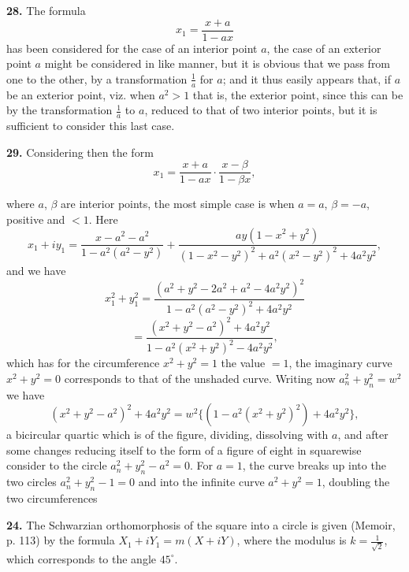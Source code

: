\documentclass[11pt,a4paper]{book}
\begin{document}
\textbf{28.} The formula
\[
x_1 = \frac{x + a}{1 - ax}
\]
has been considered for the case of an interior point $a$, the case of an exterior point $a$ might be considered in like manner, but it is obvious that we pass from one to the other, by a transformation $\frac{1}{a}$ for $a$; and it thus easily appears that, if $a$ be an exterior point, viz. when $a^2 > 1$ that is, the exterior point, since this can be by the transformation $\frac{1}{a}$ to $a$, reduced to that of two interior points, but it is sufficient to consider this last case.

\textbf{29.} Considering then the form
\[
x_1 = \frac{x + a}{1 - ax} \cdot \frac{x - \beta}{1 - \beta x},
\]

where $a$, $\beta$ are interior points, the most simple case is when $a = a$, $\beta = -a$, positive and $< 1$. Here
\[
x_1 + iy_1 = \frac{x - a^2 - a^2}{1 - a^2(a^2 - y^2)} + \frac{ay(1 - x^2 + y^2)}{(1 - x^2 - y^2)^2 + a^2(x^2 - y^2)^2 + 4a^2 y^2},
\]
and we have
\[
x_1^2 + y_1^2 = \frac{(a^2 + y^2 - 2a^2 + a^2 - 4a^2 y^2)^2}{1 - a^2(a^2 - y^2)^2 + 4a^2 y^2}
\]
\[
= \frac{(x^2 + y^2 - a^2)^2 + 4a^2 y^2}{1 - a^2(x^2 + y^2)^2 - 4a^2 y^2},
\]
which has for the circumference $x^2 + y^2 = 1$ the value $= 1$, the imaginary curve $x^2 + y^2 = 0$ corresponds to that of the unshaded curve. Writing now $a_n^2 + y_n^2 = w^2$ we have
\[
(x^2 + y^2 - a^2)^2 + 4a^2 y^2 = w^2 \{(1 - a^2(x^2 + y^2)^2) + 4a^2 y^2\},
\]
a bicircular quartic which is of the figure, dividing, dissolving with $a$, and after some changes reducing itself to the form of a figure of eight in squarewise consider to the circle $a_n^2 + y_n^2 - a^2 = 0$. For $a = 1$, the curve breaks up into the two circles $a_n^2 + y_n^2 - 1 = 0$ and into the infinite curve $a^2 + y^2 = 1$, doubling the two circumferences

\textbf{24.} The Schwarzian orthomorphosis of the square into a circle is given (Memoir, p. 113) by the formula $X_1 + iY_1 = m (X + iY)$, where the modulus is $k = \frac{1}{\sqrt{2}}$, which corresponds to the angle $45^\circ$.
\end{document}
